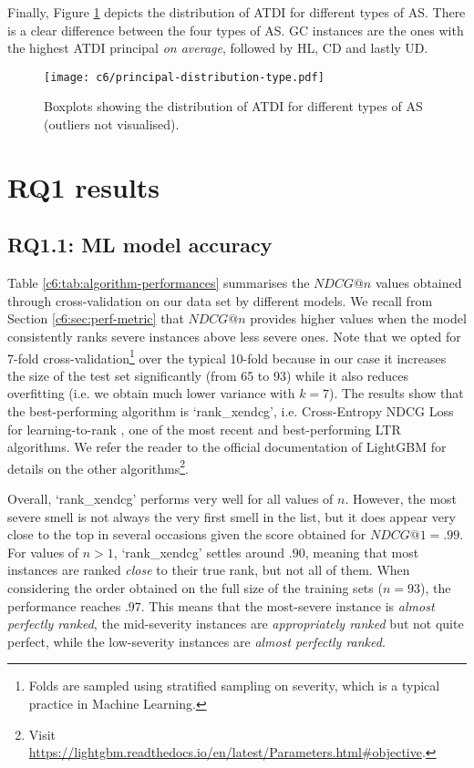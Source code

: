 Finally, Figure \ref{c6:fig:atdi-distribution-types} depicts the distribution of ATDI for different types of AS.
There is a clear difference between the four types of AS.
GC instances are the ones with the highest ATDI principal \emph{on average}, followed by HL, CD and lastly UD.

\begin{figure}
    \centering
    \texttt{[image: c6/principal-distribution-type.pdf]}
    \caption{Boxplots showing the distribution of ATDI for different types of AS (outliers not visualised).}\label{c6:fig:atdi-distribution-types}
\end{figure}

\section{RQ1 results}\label{c6:sec:rq1-results}
\subsection{RQ1.1: ML model accuracy}
Table \ref{c6:tab:algorithm-performances} summarises the $NDCG@n$ values obtained through cross-validation on our data set by different models.
We recall from Section \ref{c6:sec:perf-metric} that $NDCG@n$ provides higher values when the model consistently ranks severe instances above less severe ones.
Note that we opted for 7-fold cross-validation\footnote{Folds are sampled using stratified sampling on severity, which is a typical practice in Machine Learning.} over the typical 10-fold because in our case it increases the size of the test set significantly (from 65 to 93) while it also reduces overfitting (i.e. we obtain much lower variance with $k = 7$).
The results show that the best-performing algorithm is `rank\_xendcg', i.e. Cross-Entropy NDCG Loss for learning-to-rank \cite{Bruch2021}, one of the most recent and best-performing LTR algorithms.
We refer the reader to the official documentation of LightGBM for details on the other algorithms\footnote{Visit \url{https://lightgbm.readthedocs.io/en/latest/Parameters.html\#objective}.}.

Overall, `rank\_xendcg' performs very well for all values of $n$.
However, the most severe smell is not always the very first smell in the list, but it does appear very close to the top in several occasions given the score obtained for $NDCG@1 = .99$.
For values of $n > 1$, `rank\_xendcg' settles around $.90$, meaning that most instances are ranked \emph{close} to their true rank, but not all of them.
When considering the order obtained on the full size of the training sets ($n = 93$), the performance reaches $.97$.
This means that the most-severe instance is \emph{almost perfectly ranked}, the mid-severity instances are \emph{appropriately ranked} but not quite perfect, while the low-severity instances are \emph{almost perfectly ranked}.

